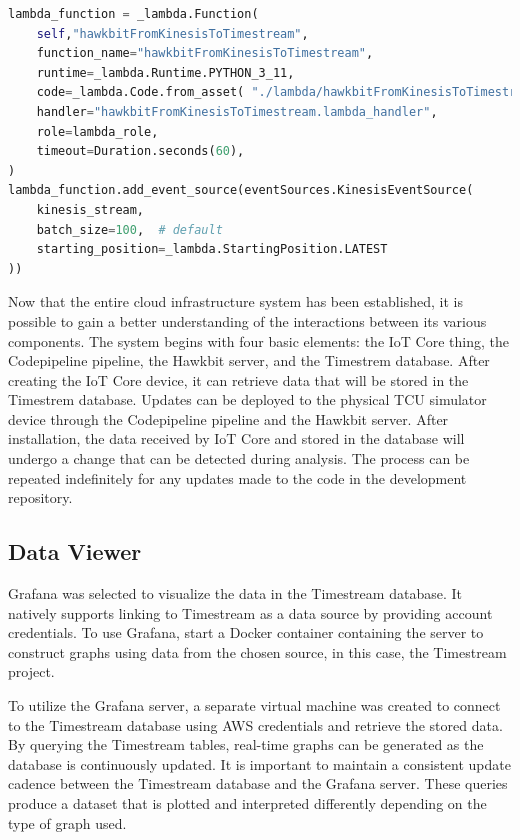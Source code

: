 \begin{lstlisting}[language=Python, caption={CDK code for the creation of Lambda function that takes data from Kinesis stream and sends it to the Timestream tables}, label=lst:AWSTimestreamlambda]
lambda_function = _lambda.Function(
    self,"hawkbitFromKinesisToTimestream",
    function_name="hawkbitFromKinesisToTimestream",
    runtime=_lambda.Runtime.PYTHON_3_11,
    code=_lambda.Code.from_asset( "./lambda/hawkbitFromKinesisToTimestream.zip"),
    handler="hawkbitFromKinesisToTimestream.lambda_handler",
    role=lambda_role,
    timeout=Duration.seconds(60),
)
lambda_function.add_event_source(eventSources.KinesisEventSource(
    kinesis_stream,
    batch_size=100,  # default
    starting_position=_lambda.StartingPosition.LATEST
))
\end{lstlisting}
Now that the entire cloud infrastructure system has been established, it is possible to gain a better understanding of the interactions between its various components. The system begins with four basic elements: the IoT Core thing, the Codepipeline pipeline, the Hawkbit server, and the Timestrem database. After creating the IoT Core device, it can retrieve data that will be stored in the Timestrem database. Updates can be deployed to the physical TCU simulator device through the Codepipeline pipeline and the Hawkbit server. After installation, the data received by IoT Core and stored in the database will undergo a change that can be detected during analysis. The process can be repeated indefinitely for any updates made to the code in the development repository.

\subsection{Data Viewer}
Grafana was selected to visualize the data in the Timestream database. It natively supports linking to Timestream as a data source by providing account credentials. To use Grafana, start a Docker container containing the server to construct graphs using data from the chosen source, in this case, the Timestream project.

To utilize the Grafana server, a separate virtual machine was created to connect to the Timestream database using AWS credentials and retrieve the stored data. By querying the Timestream tables, real-time graphs can be generated as the database is continuously updated. It is important to maintain a consistent update cadence between the Timestream database and the Grafana server. These queries produce a dataset that is plotted and interpreted differently depending on the type of graph used.

